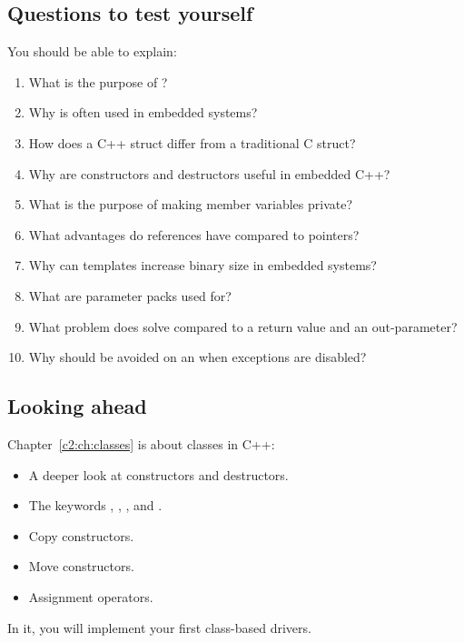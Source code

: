 \subsection*{Questions to test yourself}
You should be able to explain:
\begin{enumerate}
  \item What is the purpose of ?
  \item Why is  often used in embedded systems?
  \item How does a C++ struct differ from a traditional C struct?
  \item Why are constructors and destructors useful in embedded C++?
  \item What is the purpose of making member variables private?
  \item What advantages do references have compared to pointers?
  \item Why can templates increase binary size in embedded systems?
  \item What are parameter packs used for?
  \item What problem does  solve compared to a  return value and
    an out-parameter?
  \item Why should  be avoided on an  when exceptions are
    disabled?
\end{enumerate}

\subsection*{Looking ahead}
Chapter~\ref{c2:ch:classes} is about classes in C++:
\begin{itemize}
  \item A deeper look at constructors and destructors.
  \item The keywords , , , and .
  \item Copy constructors.
  \item Move constructors.
  \item Assignment operators.
\end{itemize}
In it, you will implement your first class-based drivers.
